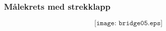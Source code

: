 \documentclass[aspectratio=169,xcolor=dvipsnames]{beamer}
\begin{document}
%
%
\begin{frame}
	\frametitle{Målekrets med strekklapp}

	$$\texttt{[image: bridge05.eps]}$$
\end{frame}

%
%
%
%
\end{document}
